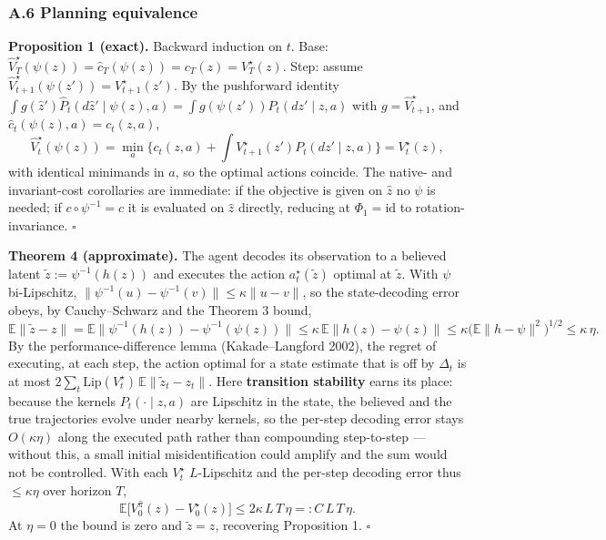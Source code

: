 \documentclass[
  letterpaper,
  11pt]{article}
\theoremstyle{plain}
\theoremstyle{definition}
\theoremstyle{remark}
\begin{document}
\subsubsection{A.6 Planning equivalence}\label{sec:A6}

\textbf{Proposition 1 (exact).} Backward induction on \(t\). Base: \(\widehat V^\star_T(\psi(z))=\widehat c_T(\psi(z))=c_T(z)=V^\star_T(z)\). Step: assume \(\widehat V^\star_{t+1}(\psi(z'))=V^\star_{t+1}(z')\). By the pushforward identity \(\int g(\widehat z')\widehat P_t(d\widehat z'\mid\psi(z),a)=\int g(\psi(z'))P_t(dz'\mid z,a)\) with \(g=\widehat V^\star_{t+1}\), and \(\widehat c_t(\psi(z),a)=c_t(z,a)\),
\[\widehat V^\star_t(\psi(z)) = \min_a\Big\{c_t(z,a)+\int V^\star_{t+1}(z')P_t(dz'\mid z,a)\Big\} = V^\star_t(z),\]
with identical minimands in \(a\), so the optimal actions coincide. The native- and invariant-cost corollaries are immediate: if the objective is given on \(\widehat z\) no \(\psi\) is needed; if \(c\circ\psi^{-1}=c\) it is evaluated on \(\widehat z\) directly, reducing at \(\Phi_1=\mathrm{id}\) to rotation-invariance. \(\square\)

\textbf{Theorem 4 (approximate).} The agent decodes its observation to a believed latent \(\tilde z := \psi^{-1}(h(z))\) and executes the action \(a^\star_t(\tilde z)\) optimal at \(\tilde z\). With \(\psi\) bi-Lipschitz, \(\|\psi^{-1}(u)-\psi^{-1}(v)\|\le\kappa\|u-v\|\), so the state-decoding error obeys, by Cauchy--Schwarz and the Theorem 3 bound,
\[\mathbb E\|\tilde z - z\| = \mathbb E\big\|\psi^{-1}(h(z))-\psi^{-1}(\psi(z))\big\| \le \kappa\,\mathbb E\|h(z)-\psi(z)\| \le \kappa\big(\mathbb E\|h-\psi\|^2\big)^{1/2} \le \kappa\,\eta.\]
By the performance-difference lemma (Kakade--Langford 2002), the regret of executing, at each step, the action optimal for a state estimate that is off by \(\Delta_t\) is at most \(2\sum_{t} \mathrm{Lip}(V^\star_t)\,\mathbb E\|\tilde z_t - z_t\|\). Here \textbf{transition stability} earns its place: because the kernels \(P_t(\cdot\mid z,a)\) are Lipschitz in the state, the believed and the true trajectories evolve under nearby kernels, so the per-step decoding error stays \(O(\kappa\eta)\) along the executed path rather than compounding step-to-step --- without this, a small initial misidentification could amplify and the sum would not be controlled. With each \(V^\star_t\) \(L\)-Lipschitz and the per-step decoding error thus \(\le\kappa\eta\) over horizon \(T\),
\[\mathbb E\big[V^{\hat\pi}_0(z)-V^\star_0(z)\big] \le 2\kappa\,L\,T\,\eta =: C\,L\,T\,\eta .\]
At \(\eta=0\) the bound is zero and \(\tilde z=z\), recovering Proposition 1. \(\square\)
\end{document}
